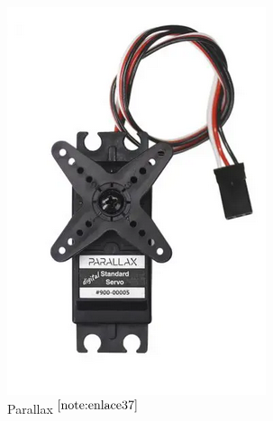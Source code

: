 \begin{figure}[ht!]
	\centering
	\begin{minipage}{0.2\linewidth}
		\centering
		\includegraphics[width=\linewidth]{figs/parallax.png}
		\caption*{\centering Parallax $^{\ref{note:enlace37}}$} %
	\end{minipage}
	\hspace{2cm}
	\begin{minipage}{0.33\linewidth}
		\centering

\end{minipage}
\end{figure}
